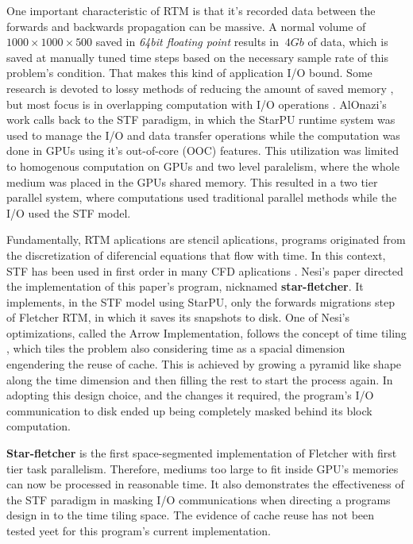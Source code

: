 \documentclass[12pt]{article}
\begin{document}
	One important characteristic of RTM is that it's recorded data between the forwards and backwards propagation can be massive. A normal volume of $1000 \times 1000 \times 500$ saved in \textit{64bit floating point} results in $~4Gb$ of data, which is saved at manually tuned time steps based on the necessary sample rate of this problem's condition. That makes this kind of application I/O bound. Some research is devoted to lossy methods of reducing the amount of saved memory \cite{huang_towards_2023}, but most focus is in overlapping computation with I/O operations \cite{alonazi_asynchronous_2019, kunas_enhancing_2025}. AlOnazi's work calls back to the STF paradigm, in which the StarPU runtime system was used to manage the I/O and data transfer operations while the computation was done in GPUs using it's out-of-core (OOC) features. This utilization was limited to homogenous computation on GPUs and two level paralelism, where the whole medium was placed in the GPUs shared memory. This resulted in a two tier parallel system, where computations used traditional parallel methods while the I/O used the STF model.
	
	Fundamentally, RTM aplications are stencil aplications, programs originated from the discretization of diferencial equations that flow with time. In this context, STF has been used in first order in many CFD aplications 
	\cite{couteyen_carpaye_design_2018, leandro_nesi_task-based_2020}.
	Nesi's paper directed the implementation of this paper's program, nicknamed \textbf{star-fletcher}. It implements, in the STF model using StarPU, only the forwards migrations step of Fletcher RTM, in which it saves its snapshots to disk. One of Nesi's optimizations, called the Arrow Implementation, follows the concept of time tiling \cite{krishnamoorthy_effective_2007, grosser_hybrid_2018, akbudak_asynchronous_2020, qu_toward_2021, qu_exploiting_2023}, which tiles the problem also considering time as a spacial dimension engendering the reuse of cache. This is achieved by growing a pyramid like shape along the time dimension and then filling the rest to start the process again.
	In adopting this design choice, and the changes it required, the program's I/O communication to disk ended up being completely masked behind its block computation.

	\textbf{Star-fletcher} is the first space-segmented implementation of Fletcher with first tier task parallelism. Therefore, mediums too large to fit inside GPU's memories can now be processed in reasonable time. It also demonstrates the effectiveness of the STF paradigm in masking I/O communications when directing a programs design in to the time tiling space. The evidence of cache reuse has not been tested yeet for this program's current implementation. 
\end{document}
